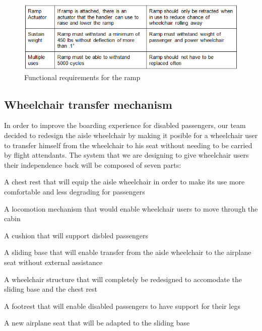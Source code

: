 \newpage

\begin{figure}[h!]
  \centering
     \includegraphics[scale=1]{images/functional_requirements_ramp.png}
   \caption{Functional requirements for the ramp}
  \label{fig:fun_req_ramp}
\end{figure}

\newpage

\subsection*{Wheelchair transfer mechanism}

In order to improve the boarding experience for disabled passengers, our team decided to redesign the aisle wheelchair by making it posible for a wheelchair user to transfer himself from the wheelchair to his seat without needing to be carried by flight attendants. The system that we are designing to give wheelchair users their independence back will be composed of seven parts:

\begin{list}{-}{}
  \item A chest rest that will equip the aisle wheelchair in order to make its use more comfortable and less degrading for passengers
  \item A locomotion mechanism that would enable wheelchair users to move through the cabin
  \item A cushion that will support disbled passengers
  \item A sliding base that will enable transfer from the aisle wheelchair to the airplane seat without external assistance
  \item A wheelchair structure that will completely be redesigned to accomodate the sliding base and the chest rest
  \item A footrest that will enable disabled passengers to have support for their legs
  \item A new airplane seat that will be adapted to the sliding base
\end{list}

